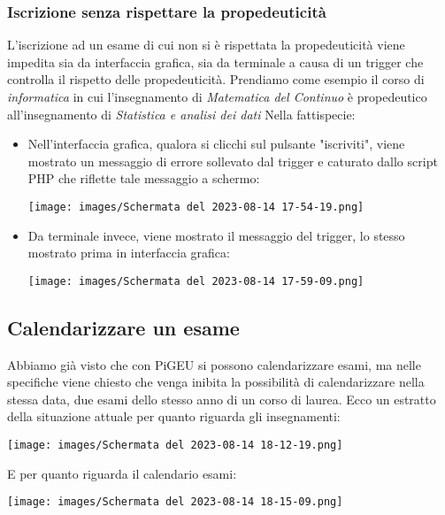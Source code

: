 \documentclass{article}
\begin{document}
\subsubsection{Iscrizione senza rispettare la propedeuticità}
L'iscrizione ad un esame di cui non si è rispettata la propedeuticità viene impedita sia da interfaccia grafica, sia da terminale a causa di un trigger che controlla il rispetto delle propedeuticità. Prendiamo come esempio il corso di \textit{informatica} in cui l'insegnamento di \textit{Matematica del Continuo} è propedeutico all'insegnamento di \textit{Statistica e analisi dei dati}
Nella fattispecie:
\begin{itemize}
    \item Nell'interfaccia grafica, qualora si clicchi sul pulsante "iscriviti", viene mostrato un messaggio di errore sollevato dal trigger e caturato dallo script PHP che riflette tale messaggio a schermo:

    \texttt{[image: images/Schermata del 2023-08-14 17-54-19.png]}

    \item Da terminale invece, viene mostrato il messaggio del trigger, lo stesso mostrato prima in interfaccia grafica:

    \texttt{[image: images/Schermata del 2023-08-14 17-59-09.png]}
\end{itemize}

\subsection{Calendarizzare un esame}
Abbiamo già visto che con PiGEU si possono calendarizzare esami, ma nelle specifiche viene chiesto che venga inibita la possibilità di calendarizzare nella stessa data, due esami dello stesso anno di un corso di laurea.
Ecco un estratto della situazione attuale per quanto riguarda gli insegnamenti:

\texttt{[image: images/Schermata del 2023-08-14 18-12-19.png]}

E per quanto riguarda il calendario esami:

\texttt{[image: images/Schermata del 2023-08-14 18-15-09.png]}
\end{document}

